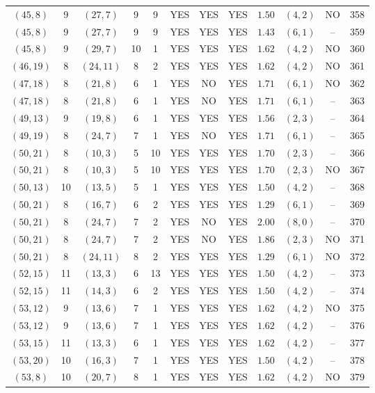 \begin{longtable}{|c|c|c|c|c|c|c|c|c|c|c|c|}
$(45,8)$ & 9 & $(27,7)$ & 9 & 9 & YES & YES & YES & $1.50$ & $(4,2)$ & NO & 358\\
$(45,8)$ & 9 & $(27,7)$ & 9 & 9 & YES & YES & YES & $1.43$ & $(6,1)$ & -- & 359\\
$(45,8)$ & 9 & $(29,7)$ & 10 & 1 & YES & YES & YES & $1.62$ & $(4,2)$ & NO & 360\\
$(46,19)$ & 8 & $(24,11)$ & 8 & 2 & YES & YES & YES & $1.62$ & $(4,2)$ & NO & 361\\
$(47,18)$ & 8 & $(21,8)$ & 6 & 1 & YES & NO & YES & $1.71$ & $(6,1)$ & NO & 362\\
$(47,18)$ & 8 & $(21,8)$ & 6 & 1 & YES & NO & YES & $1.71$ & $(6,1)$ & -- & 363\\
$(49,13)$ & 9 & $(19,8)$ & 6 & 1 & YES & YES & YES & $1.56$ & $(2,3)$ & -- & 364\\
$(49,19)$ & 8 & $(24,7)$ & 7 & 1 & YES & NO & YES & $1.71$ & $(6,1)$ & -- & 365\\
$(50,21)$ & 8 & $(10,3)$ & 5 & 10 & YES & YES & YES & $1.70$ & $(2,3)$ & -- & 366\\
$(50,21)$ & 8 & $(10,3)$ & 5 & 10 & YES & YES & YES & $1.70$ & $(2,3)$ & NO & 367\\
$(50,13)$ & 10 & $(13,5)$ & 5 & 1 & YES & YES & YES & $1.50$ & $(4,2)$ & -- & 368\\
$(50,21)$ & 8 & $(16,7)$ & 6 & 2 & YES & YES & YES & $1.29$ & $(6,1)$ & -- & 369\\
$(50,21)$ & 8 & $(24,7)$ & 7 & 2 & YES & NO & YES & $2.00$ & $(8,0)$ & -- & 370\\
$(50,21)$ & 8 & $(24,7)$ & 7 & 2 & YES & NO & YES & $1.86$ & $(2,3)$ & NO & 371\\
$(50,21)$ & 8 & $(24,11)$ & 8 & 2 & YES & YES & YES & $1.29$ & $(6,1)$ & NO & 372\\
$(52,15)$ & 11 & $(13,3)$ & 6 & 13 & YES & YES & YES & $1.50$ & $(4,2)$ & -- & 373\\
$(52,15)$ & 11 & $(14,3)$ & 6 & 2 & YES & YES & YES & $1.50$ & $(4,2)$ & -- & 374\\
$(53,12)$ & 9 & $(13,6)$ & 7 & 1 & YES & YES & YES & $1.62$ & $(4,2)$ & NO & 375\\
$(53,12)$ & 9 & $(13,6)$ & 7 & 1 & YES & YES & YES & $1.62$ & $(4,2)$ & -- & 376\\
$(53,15)$ & 11 & $(13,3)$ & 6 & 1 & YES & YES & YES & $1.62$ & $(4,2)$ & -- & 377\\
$(53,20)$ & 10 & $(16,3)$ & 7 & 1 & YES & YES & YES & $1.50$ & $(4,2)$ & -- & 378\\
$(53,8)$ & 10 & $(20,7)$ & 8 & 1 & YES & YES & YES & $1.62$ & $(4,2)$ & NO & 379\\

\end{longtable}
